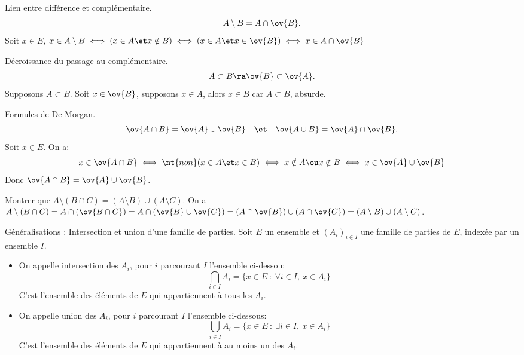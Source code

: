 \documentclass[11pt]{article}
\begin{document}
\begin{prop}{Lien entre différence et complémentaire.}{}
    \begin{equation*}
        A\setminus B=A\cap\ov{B}.
    \end{equation*}
    \tcblower
    Soit $x\in E$, $x\in A\setminus B\iff(x\in A\et x\notin B)\iff(x\in A \et x\in \ov{B})\iff x\in A\cap\ov{B}$
\end{prop}

\begin{prop}{Décroissance du passage au complémentaire.}{}
    \begin{equation*}
        A \subset B \ra \ov{B} \subset \ov{A}.
    \end{equation*}
    \tcblower
    Supposons $A\subset B$. Soit $x\in\ov{B}$, supposons $x\in A$, alors $x\in B$ car $A\subset B$, absurde.
\end{prop}

\begin{prop}{Formules de De Morgan.}{}
    \begin{equation*}
        \ov{A\cap B}=\ov{A}\cup\ov{B}\quad\et\quad\ov{A\cup B}=\ov{A}\cap\ov{B}.
    \end{equation*}
    \tcblower
    Soit $x\in E$. On a:
    \begin{equation*}
        x\in\ov{A\cap B}\iff \nt{non}(x\in A \et x \in B)\iff x\notin A \ou x\notin B\iff x\in\ov{A}\cup\ov{B} 
    \end{equation*}
    Donc $\ov{A\cap B}=\ov{A}\cup\ov{B}$.
\end{prop}

\begin{ex}{}{}
    Montrer que $A\setminus(B\cap C)=(A\setminus B)\cup(A\setminus C)$.
    \tcblower
    On a $A\setminus(B\cap C)=A\cap(\ov{B\cap C})=A\cap(\ov{B}\cup\ov{C})=(A\cap\ov{B})\cup(A\cap\ov{C})=(A\setminus B)\cup(A\setminus C)$.
\end{ex}

\begin{defi}{Généralisations : Intersection et union d'une famille de parties.}{}
    Soit $E$ un ensemble et $(A_i)_{i\in I}$ une famille de parties de $E$, indexée par un ensemble $I$.
    \begin{itemize}
        \item On appelle intersection des $A_i$, pour $i$ parcourant $I$ l'ensemble ci-dessou:
        \begin{equation*}
            \bigcap_{i\in I}A_i = \{x\in E~:~\forall i \in I,~x\in A_i\}
        \end{equation*}
        C'est l'ensemble des éléments de $E$ qui appartiennent à tous les $A_i$.
        \item On appelle union des $A_i$, pour $i$ parcourant $I$ l'ensemble ci-dessous:
        \begin{equation*}
            \bigcup_{i\in I}A_i = \{x\in E~:~\exists i \in I,~x\in A_i\}
        \end{equation*}
        C'est l'ensemble des éléments de $E$ qui appartiennent à au moins un des $A_i$.
    \end{itemize}
\end{defi}
\end{document}
